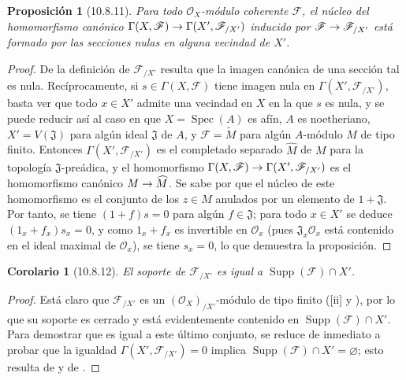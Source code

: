 \documentclass[oneside]{amsart}
\theoremstyle{ega-env-style}
\theoremstyle{ega-thm-env-style}
\newtheorem*{proposition}{Proposición}
\newtheorem*{corollary}{Corolario}
\theoremstyle{ega-defn-env-style}
\renewcommand{\to}{\mathchoice{\longrightarrow}{\rightarrow}{\rightarrow}{\rightarrow}}
\newcommand{\oldpage}[2][]{{\marginnote{\normalfont{\textbf{#1}~|~#2}}}\ignorespaces}
\let\EGAOriginalLabel\label
\renewcommand{\label}[1]{\phantomsection\EGAOriginalLabel{#1}}
\begin{document}
\begin{proposition}[10.8.11]
\label{I.10.8.11}
Para todo $\mathscr{O}_X$-módulo coherente $\mathscr{F}$, el núcleo del homomorfismo canónico $\Gamma(X,\mathscr{F})\to\Gamma(X',\mathscr{F}_{/X'})$ inducido por $\mathscr{F}\to\mathscr{F}_{/X'}$ está formado por las secciones nulas en alguna vecindad de $X'$.
\end{proposition}

\begin{proof}
De la definición de $\mathscr{F}_{/X'}$ resulta que la imagen canónica de una sección tal es nula.
Recíprocamente, si $s\in\Gamma(X,\mathscr{F})$ tiene imagen nula en $\Gamma(X',\mathscr{F}_{/X'})$, basta ver que todo $x\in X'$ admite una vecindad en $X$ en la que $s$ es nula, y se puede reducir así al caso en que $X=\operatorname{Spec}(A)$ es afín, $A$ es noetheriano, $X'=V(\mathfrak{J})$ para algún ideal $\mathfrak{J}$ de $A$, y $\mathscr{F}=\widetilde M$ para algún $A$-módulo $M$ de tipo finito.
Entonces $\Gamma(X',\mathscr{F}_{/X'})$ es el completado separado $\widehat M$ de $M$ para la topología $\mathfrak{J}$-preádica, y el homomorfismo $\Gamma(X,\mathscr{F})\to\Gamma(X',\mathscr{F}_{/X'})$ es el homomorfismo canónico $M\to\widehat M$.
Se sabe por  que el núcleo de este homomorfismo es el conjunto de los $z\in M$ anulados por un elemento de $1+\mathfrak{J}$.
Por tanto, se tiene $(1+f)s=0$ para algún $f\in\mathfrak{J}$; para todo $x\in X'$ se deduce $(1_x+f_x)s_x=0$, y como $1_x+f_x$ es invertible en $\mathscr{O}_x$ (pues $\mathfrak{J}_x\mathscr{O}_x$ está contenido en el ideal maximal de $\mathscr{O}_x$), se tiene $s_x=0$, lo que demuestra la proposición.
\end{proof}

\begin{corollary}[10.8.12]
\label{I.10.8.12}
El soporte de $\mathscr{F}_{/X'}$ es igual a $\operatorname{Supp}(\mathscr{F})\cap X'$.
\end{corollary}

\begin{proof}
Está claro que $\mathscr{F}_{/X'}$ es un $(\mathscr{O}_X)_{/X'}$-módulo de tipo finito ([ii] y ),
\oldpage[I]{198}
por lo que su soporte es cerrado  y está evidentemente contenido en $\operatorname{Supp}(\mathscr{F})\cap X'$.
Para demostrar que es igual a este último conjunto, se reduce de inmediato a probar que la igualdad $\Gamma(X',\mathscr{F}_{/X'})=0$ implica $\operatorname{Supp}(\mathscr{F})\cap X'=\varnothing$; esto resulta de  y de .
\end{proof}
\end{document}
